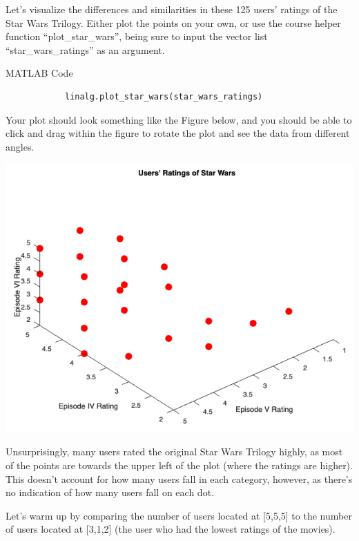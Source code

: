 \documentclass{ximera}
\begin{document}
  Let's visualize the differences and similarities in these 125 users' ratings of the Star Wars Trilogy. Either plot the points on your own, or use the course helper function ``plot\_star\_wars'', being sure to input the vector list ``star\_wars\_ratings'' as an argument.

  \begin{hint}{MATLAB Code}
        \begin{verbatim}
            linalg.plot_star_wars(star_wars_ratings)
        \end{verbatim}
  \end{hint}

  Your plot should look something like the Figure below, and you should be able to click and drag within the figure to rotate the plot and see the data from different angles.

  \begin{center}
    \includegraphics[width=.75\textwidth]{star_wars_ratings.png}
  \end{center}

  Unsurprisingly, many users rated the original Star Wars Trilogy highly, as most of the points are towards the upper left of the plot (where the ratings are higher). This doesn't account for how many users fall in each category, however, as there's no indication of how  many users fall on each dot. 

  Let's warm up by comparing the number of users located at [5,5,5] to the number of users located at [3,1,2] (the user who had the lowest ratings of the movies).
\end{document}
